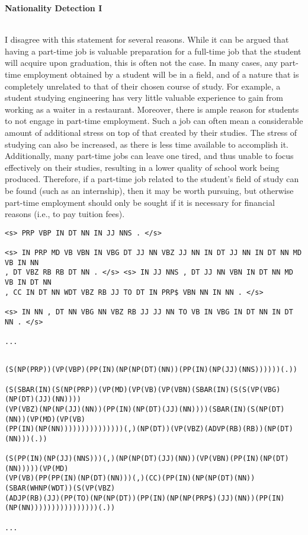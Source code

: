 \documentclass[11pt]{article}
\begin{document}
\textbf{Nationality Detection I}

~\\
I disagree with this statement for several reasons.  While it can be argued that
having a part-time job is valuable preparation for a full-time job that the
student will acquire upon graduation, this is often not the case. In many cases,
any part-time employment obtained by a student will be in a field, and of a
nature that is completely unrelated to that of their chosen course of study. For
example, a student studying engineering has very little valuable experience to
gain from working as a waiter in a restaurant.  Moreover, there is ample reason
for students to not engage in part-time employment. Such a job can often mean a
considerable amount of additional stress on top of that created by their
studies. The stress of studying can also be increased, as there is less time
available to accomplish it. Additionally, many part-time jobs can leave one
tired, and thus unable to focus effectively on their studies, resulting in a
lower quality of school work being produced.  Therefore, if a part-time job
related to the student's field of study can be found (such as an internship),
then it may be worth pursuing, but otherwise part-time employment should only be
sought if it is necessary for financial reasons (i.e., to pay tuition fees).

\begin{verbatim}
<s> PRP VBP IN DT NN IN JJ NNS . </s>

<s> IN PRP MD VB VBN IN VBG DT JJ NN VBZ JJ NN IN DT JJ NN IN DT NN MD VB IN NN
, DT VBZ RB RB DT NN . </s> <s> IN JJ NNS , DT JJ NN VBN IN DT NN MD VB IN DT NN
, CC IN DT NN WDT VBZ RB JJ TO DT IN PRP$ VBN NN IN NN . </s>

<s> IN NN , DT NN VBG NN VBZ RB JJ JJ NN TO VB IN VBG IN DT NN IN DT NN . </s> 

...
\end{verbatim}

\begin{verbatim}

(S(NP(PRP))(VP(VBP)(PP(IN)(NP(NP(DT)(NN))(PP(IN)(NP(JJ)(NNS))))))(.))

(S(SBAR(IN)(S(NP(PRP))(VP(MD)(VP(VB)(VP(VBN)(SBAR(IN)(S(S(VP(VBG)(NP(DT)(JJ)(NN))))
(VP(VBZ)(NP(NP(JJ)(NN))(PP(IN)(NP(DT)(JJ)(NN))))(SBAR(IN)(S(NP(DT)(NN))(VP(MD)(VP(VB)
(PP(IN)(NP(NN)))))))))))))))(,)(NP(DT))(VP(VBZ)(ADVP(RB)(RB))(NP(DT)(NN)))(.))

(S(PP(IN)(NP(JJ)(NNS)))(,)(NP(NP(DT)(JJ)(NN))(VP(VBN)(PP(IN)(NP(DT)(NN)))))(VP(MD)
(VP(VB)(PP(PP(IN)(NP(DT)(NN)))(,)(CC)(PP(IN)(NP(NP(DT)(NN))(SBAR(WHNP(WDT))(S(VP(VBZ)
(ADJP(RB)(JJ)(PP(TO)(NP(NP(DT))(PP(IN)(NP(NP(PRP$)(JJ)(NN))(PP(IN)
(NP(NN))))))))))))))))(.))

...
\end{verbatim}
\end{document}
